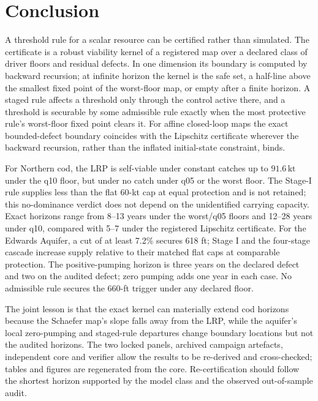 \documentclass[11pt,a4paper]{article}
\theoremstyle{plain}
\theoremstyle{definition}
\theoremstyle{remark}
\newcommand{\kt}{\,\mathrm{kt}}
\begin{document}
\section{Conclusion}\label{sec:conclusion}

A threshold rule for a scalar resource can be certified rather than simulated. The certificate is a robust viability kernel of a registered map over a declared class of driver floors and residual defects. In one dimension its boundary is computed by backward recursion; at infinite horizon the kernel is the safe set, a half-line above the smallest fixed point of the worst-floor map, or empty after a finite horizon. A staged rule affects a threshold only through the control active there, and a threshold is securable by some admissible rule exactly when the most protective rule's worst-floor fixed point clears it. For affine closed-loop maps the exact bounded-defect boundary coincides with the Lipschitz certificate wherever the backward recursion, rather than the inflated initial-state constraint, binds.

For Northern cod, the LRP is self-viable under constant catches up to $91.6\kt$ under the q10 floor, but under no catch under q05 or the worst floor. The Stage-I rule supplies less than the flat 60-kt cap at equal protection and is not retained; this no-dominance verdict does not depend on the unidentified carrying capacity. Exact horizons range from 8--13 years under the worst/q05 floors and 12--28 years under q10, compared with 5--7 under the registered Lipschitz certificate. For the Edwards Aquifer, a cut of at least 7.2\% secures 618 ft; Stage I and the four-stage cascade increase supply relative to their matched flat caps at comparable protection. The positive-pumping horizon is three years on the declared defect and two on the audited defect; zero pumping adds one year in each case. No admissible rule secures the 660-ft trigger under any declared floor.

The joint lesson is that the exact kernel can materially extend cod horizons because the Schaefer map's slope falls away from the LRP, while the aquifer's local zero-pumping and staged-rule departures change boundary locations but not the audited horizons. The two locked panels, archived campaign artefacts, independent core and verifier allow the results to be re-derived and cross-checked; tables and figures are regenerated from the core. Re-certification should follow the shortest horizon supported by the model class and the observed out-of-sample audit.
\end{document}
